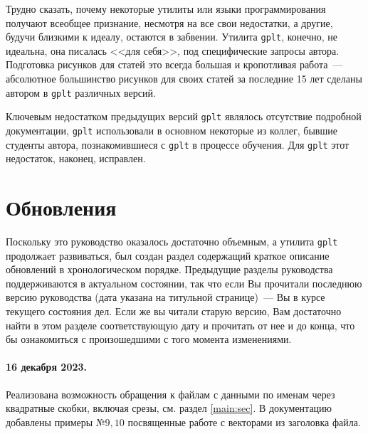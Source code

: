 \documentclass[12pt]{article}
\def\gplt{{\tt gplt}}
\begin{document}
Трудно сказать, почему некоторые утилиты или языки программирования получают всеобщее признание, несмотря на все свои недостатки,
а другие, будучи близкими к идеалу, остаются в забвении. 
Утилита \gplt{}, конечно, не идеальна, она писалась <<для себя>>, под специфические запросы автора.
Подготовка рисунков для статей это всегда большая и кропотливая работа~---
абсолютное большинство рисунков для своих статей за последние 15 лет сделаны автором в \verb'gplt' различных версий.

Ключевым недостатком предыдущих версий \verb'gplt' являлось отсутствие подробной документации,
\verb'gplt' использовали в основном некоторые из коллег, бывшие студенты автора, познакомившиеся с \verb'gplt'
в процессе обучения. Для \gplt{}  этот недостаток, наконец, исправлен. 




\appendix\section{Обновления}
Поскольку это руководство оказалось достаточно объемным, а утилита \gplt{} продолжает развиваться, был создан раздел содержащий краткое описание обновлений
в хронологическом порядке. Предыдущие разделы руководства поддерживаются в актуальном состоянии, так что если Вы прочитали последнюю версию руководства
(дата указана на титульной странице)~--- Вы в курсе текущего состояния дел. Если же вы читали старую версию, Вам достаточно найти в этом разделе
соответствующую дату и прочитать от нее и до конца, что бы ознакомиться с произошедшими с того момента изменениями.

\paragraph{16 декабря 2023.} Реализована возможность обращения к файлам с данными по именам через квадратные скобки, включая срезы,
см. раздел \ref{main:sec}. В документацию добавлены примеры №$9, 10$ посвященные работе с векторами из заголовка файла.
\end{document}
